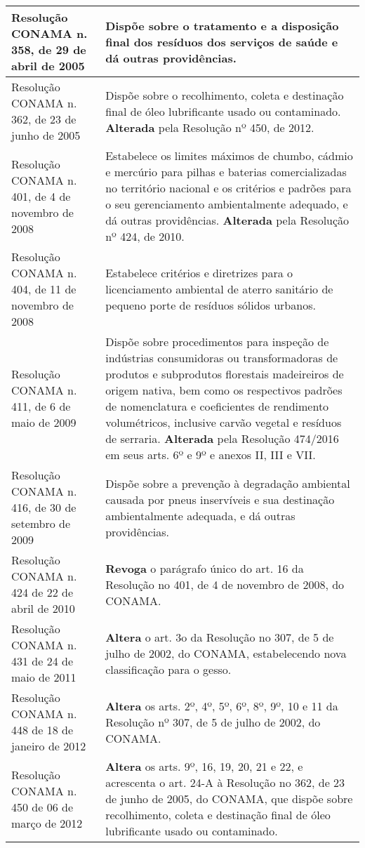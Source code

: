 \begin{center}
\begin{longtable}{|p{}|p{}|}
			Resolução   CONAMA   n.   358, de 29 de abril de 2005 & Dispõe sobre o tratamento e a disposição final dos resíduos dos serviços de saúde e dá outras providências. \\
			\hline
			Resolução   CONAMA   n.   362, de 23 de junho de 2005 & Dispõe  sobre  o  recolhimento,  coleta  e  destinação  final  de  óleo  lubrificante usado ou contaminado. \textbf{Alterada} pela Resolução nº 450, de 2012.
			\\
			\hline
			Resolução   CONAMA   n.   401, de 4 de novembro de 2008 & Estabelece os limites máximos de chumbo, cádmio e mercúrio para pilhas e baterias comercializadas no território nacional e os critérios e padrões para o seu gerenciamento ambientalmente adequado, e dá outras providências. \textbf{Alterada} pela Resolução nº 424, de 2010. \\
			\hline
			Resolução   CONAMA   n.   404, de 11 de novembro de 2008 & Estabelece  critérios  e  diretrizes  para  o  licenciamento  ambiental  de  aterro sanitário de pequeno porte de resíduos sólidos urbanos. \\
			\hline
			Resolução   CONAMA   n.   411, de 6 de maio de 2009 & Dispõe  sobre  procedimentos  para  inspeção  de  indústrias  consumidoras  ou transformadoras  de produtos e subprodutos  florestais  madeireiros  de origem nativa, bem como os respectivos padrões de nomenclatura e coeficientes de rendimento volumétricos, inclusive carvão vegetal e resíduos de serraria. \textbf{Alterada} pela Resolução 474/2016 em seus arts. 6º e 9º e anexos II, III e VII. \\
			\hline
			Resolução   CONAMA   n.   416, de 30 de setembro de 2009 & Dispõe  sobre  a  prevenção  à  degradação  ambiental  causada  por  pneus inservíveis   e   sua   destinação   ambientalmente   adequada,   e   dá   outras providências. \\
			\hline
			Resolução CONAMA n. 424 de 22 de abril de 2010 & \textbf{Revoga} o parágrafo único do art. 16 da Resolução no 401, de 4 de novembro de 2008, do CONAMA.\\
			\hline
			Resolução CONAMA n. 431 de 24 de maio de 2011 & \textbf{Altera} o art. 3o da Resolução no 307, de 5 de julho de 2002, do CONAMA, estabelecendo nova classificação para o gesso. \\
			\hline
			Resolução CONAMA n. 448 de 18 de janeiro de 2012 & \textbf{Altera } os arts. 2º, 4º, 5º, 6º, 8º, 9º, 10 e 11 da Resolução nº 307, de 5 de julho de 2002, do CONAMA. \\
			\hline
			Resolução CONAMA n. 450 de 06 de março de 2012 & \textbf{Altera} os arts. 9º, 16, 19, 20, 21 e 22, e acrescenta o art. 24-A à Resolução no 362, de 23 de junho de 2005, do CONAMA, que dispõe sobre recolhimento, coleta e destinação final de óleo lubrificante usado ou contaminado.\\

\end{longtable}
\end{center}
